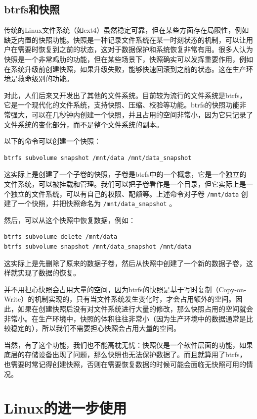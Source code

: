 \subsection{btrfs和快照}

传统的Linux文件系统（如ext4）虽然稳定可靠，但在某些方面存在局限性，例如缺乏内置的快照功能。快照是一种记录文件系统在某一时刻状态的机制，可以让用户在需要时恢复到之前的状态，这对于数据保护和系统恢复非常有用。很多人认为快照是一个非常鸡肋的功能，但在某些场景下，快照确实可以发挥重要作用，例如在系统升级前创建快照，如果升级失败，能够快速回滚到之前的状态。这在生产环境是救命级别的功能。

对此，人们后来又开发出了其他的文件系统。目前较为流行的文件系统是btrfs，它是一个现代化的文件系统，支持快照、压缩、校验等功能。btrfs的快照功能非常强大，可以在几秒钟内创建一个快照，并且占用的空间非常小，因为它只记录了文件系统的变化部分，而不是整个文件系统的副本。

以下的命令可以创建一个快照：
\begin{verbatim}
btrfs subvolume snapshot /mnt/data /mnt/data_snapshot
\end{verbatim}
这实际上是创建了一个子卷的快照，子卷是btrfs中的一个概念，它是一个独立的文件系统，可以被挂载和管理。我们可以把子卷看作是一个目录，但它实际上是一个独立的文件系统，可以有自己的权限、配额等。上述命令对子卷 \texttt{/mnt/data} 创建了一个快照，并把快照命名为 \texttt{/mnt/data\_snapshot} 。

然后，可以从这个快照中恢复数据，例如：
\begin{verbatim}
btrfs subvolume delete /mnt/data
btrfs subvolume snapshot /mnt/data_snapshot /mnt/data
\end{verbatim}
这实际上是先删除了原来的数据子卷，然后从快照中创建了一个新的数据子卷，这样就实现了数据的恢复。

并不用担心快照会占用大量的空间，因为btrfs的快照是基于写时复制（Copy-on-Write）的机制实现的，只有当文件系统发生变化时，才会占用额外的空间。因此，如果在创建快照后没有对文件系统进行大量的修改，那么快照占用的空间就会非常小。在生产环境中，快照的体积往往非常小（因为生产环境中的数据通常是比较稳定的），所以我们不需要担心快照会占用大量的空间。

当然，有了这个功能，我们也不能高枕无忧：快照仅是一个软件层面的功能，如果底层的存储设备出现了问题，那么快照也无法保护数据了。而且就算用了btrfs，也需要时常记得创建快照，否则在需要恢复数据的时候可能会面临无快照可用的情况。

\section{Linux的进一步使用}

